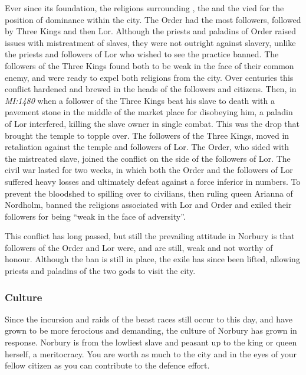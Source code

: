 Ever since its foundation, the religions surrounding , the
 and the  vied for the position of
dominance within the city. The Order had the most followers, followed by Three
Kings and then Lor. Although the priests and paladins of Order raised issues
with mistreatment of slaves, they were not outright against slavery, unlike
the priests and followers of Lor who wished to see the practice banned. The
followers of the Three Kings found both to be weak in the face of their common
enemy, and were ready to expel both religions from the city. Over centuries
this conflict hardened and brewed in the heads of the followers and
citizens. Then, in \emph{MI:1480} when a follower of the Three Kings beat his
slave to death with a pavement stone in the middle of the market place for
disobeying him, a paladin of Lor interfered, killing the slave owner in single
combat. This was the drop that brought the temple to topple over. The
followers of the Three Kings, moved in retaliation against the temple and
followers of Lor. The Order, who sided with the mistreated slave, joined the
conflict on the side of the followers of Lor. The civil war lasted for two
weeks, in which both the Order and the followers of Lor suffered heavy losses
and ultimately defeat against a force inferior in numbers. To prevent the
bloodshed to spilling over to civilians, then ruling queen Arianna of
Nordholm, banned the religions associated with Lor and Order and exiled their
followers for being ``weak in the face of adversity''.

This conflict has long passed, but still the prevailing attitude in Norbury is
that followers of the Order and Lor were, and are still, weak and not worthy
of honour. Although the ban is still in place, the exile has since been
lifted, allowing priests and paladins of the two gods to visit the city.

\subsubsection{Culture}

Since the incursion and raids of the beast races still occur to this day,
and have grown to be more ferocious and demanding, the culture of Norbury
has grown in response. Norbury is from the lowliest slave and peasant up
to the king or queen herself, a meritocracy. You are worth as much to the
city and in the eyes of your fellow citizen as you can contribute to the
defence effort.

